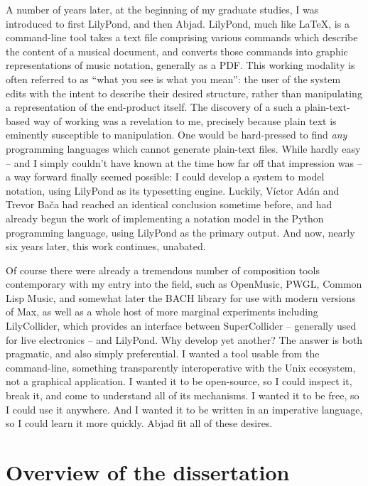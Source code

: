 A number of years later, at the beginning of my graduate studies, I was
introduced to first LilyPond, and then Abjad. LilyPond, much like \LaTeX{},
is a command-line tool takes a text file comprising various commands which
describe the content of a musical document, and converts those commands into
graphic representations of music notation, generally as a PDF. This working
modality is often referred to as \enquote{what you see is what you mean}: the
user of the system edits with the intent to describe their desired structure,
rather than manipulating a representation of the end-product itself. The
discovery of a such a plain-text-based way of working was a revelation to me,
precisely because plain text is eminently susceptible to manipulation. One
would be hard-pressed to find \emph{any} programming languages which cannot
generate plain-text files. While hardly easy -- and I simply couldn't have
known at the time how far off that impression was -- a way forward finally
seemed possible: I could develop a system to model notation, using LilyPond as
its typesetting engine. Luckily, V\'{i}ctor Ad\'{a}n and Trevor Ba\v{c}a had
reached an identical conclusion sometime before, and had already begun the work
of implementing a notation model in the Python programming language, using
LilyPond as the primary output. And now, nearly six years later, this work
continues, unabated.

Of course there were already a tremendous number of composition tools
contemporary with my entry into the field, such as
OpenMusic,\cite{assayag1999sw} PWGL,\cite{laurson2009qf, kuuskankare2004recent}
Common Lisp Music,\cite{taube1991common} and somewhat later the
BACH\cite{agostini2013real} library for use with modern versions of Max, as
well as a whole host of more marginal experiments including LilyCollider, which
provides an interface between SuperCollider\cite{mccartney2002rethinking} --
generally used for live electronics -- and LilyPond. Why develop yet another?
The answer is both pragmatic, and also simply preferential. I wanted a tool
usable from the command-line, something transparently interoperative with the
Unix ecosystem, not a graphical application. I wanted it to be open-source, so
I could inspect it, break it, and come to understand all of its mechanisms. I
wanted it to be free, so I could use it anywhere. And I wanted it to be written
in an imperative language, so I could learn it more quickly. Abjad fit all of
these desires.

\section{Overview of the dissertation}
\label{sec:overview-of-the-dissertation}

